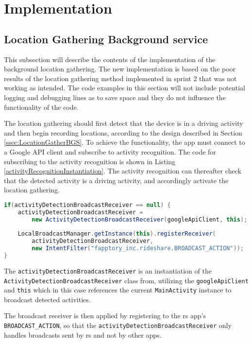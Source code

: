 \section{Implementation}

\subsection{Location Gathering Background service}
This subsection will describe the contents of the implementation of the background location gathering.
The new implementation is based on the poor results  of the location gathering method implemented in sprint 2 that was not working as intended.
The code examples in this section will not include potential logging and debugging lines as to save space and they do not influence the functionality of the code.


The location gathering should first detect that the device is in a driving activity and then begin recording locations, according to the design described in Section \ref{ssec:LocationGatherBGS}.
To achieve the functionality, the app must connect to a Google API client and subscribe to activity recognition.
The code for subscribing to the activity recognition is shown in Listing \ref{activityRecognitionInstantiation}.
The activity recognition can thereafter check that the detected activity is a driving activity, and accordingly activate the location gathering.

\begin{lstlisting}[language=Java, label=activityRecognitionInstantiation, caption=Initialization of activity recognition.]
if(activityDetectionBroadcastReceiver == null) {
	activityDetectionBroadcastReceiver = 
		new ActivityDetectionBroadcastReceiver(googleApiClient, this);
		
	LocalBroadcastManager.getInstance(this).registerReceiver(
		activityDetectionBroadcastReceiver, 
		new IntentFilter("fapptory_inc.rideshare.BROADCAST_ACTION"));
}
\end{lstlisting}

The \texttt{activityDetectionBroadcastReceiver} is an instantiation of the\\ \texttt{ActivityDetectionBroadcastReceiver} class from, utilizing the \texttt{googleApiClient} and \texttt{this} which in this case references the current \texttt{MainActivity} instance to broadcast detected activities.

The broadcast receiver is then applied by registering to the \gls{rs} app's\\ \texttt{BROADCAST\_ACTION}, so that the \texttt{activityDetectionBroadcastReceiver} only handles broadcasts sent by \gls{rs} and not by other apps.

